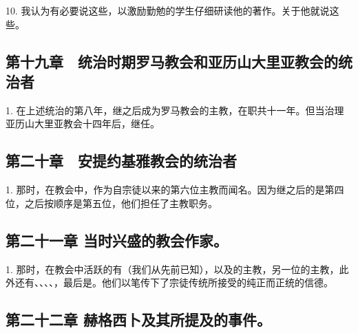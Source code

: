 10. 我认为有必要说这些，以激励勤勉的学生仔细研读他的著作。关于他就说这些。\par


\subsection{第十九章　统治时期罗马教会和亚历山大里亚教会的统治者}

1. 在上述统治的第八年，继之后成为罗马教会的主教，在职共十一年。但当治理亚历山大里亚教会十四年后，继任。\par


\subsection{第二十章　安提约基雅教会的统治者}

1. 那时，在教会中，作为自宗徒以来的第六位主教而闻名。因为继之后的是第四位，之后按顺序是第五位，他们担任了主教职务。\par


\subsection{第二十一章 当时兴盛的教会作家。}

1. 那时，在教会中活跃的有（我们从先前已知），以及的主教，另一位的主教，此外还有、、、、，最后是。他们以笔传下了宗徒传统所接受的纯正而正统的信德。\par


\subsection{第二十二章 赫格西卜及其所提及的事件。}

